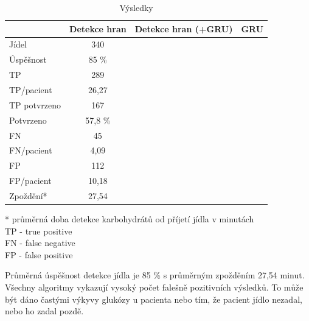 \begin{table}[H]
\caption{Výsledky}
\label{tab:results}
\begin{tabular}{|l|c|c|c|}
\hline 
& \textbf{Detekce hran} & \textbf{Detekce hran (+GRU)} & \textbf{ GRU }\\
\hline 
\hline 
Jídel & 340 &  &  \\\hline
Úspěšnost & 85 \% &  &  \\\hline
TP & 289 &  &  \\\hline
TP/pacient & 26,27 &  &  \\\hline
TP potvrzeno & 167 &  &  \\\hline
Potvrzeno & 57,8 \% &  &  \\\hline
FN & 45 &  &  \\\hline
FN/pacient & 4,09 &  &  \\\hline
FP & 112 &  &  \\\hline
FP/pacient & 10,18 &  &  \\\hline
Zpoždění* & 27,54 &  &  \\
\hline
\end{tabular}
\begin{flushleft}
* průměrná doba detekce karbohydrátů od příjetí jídla v minutách\\
TP - true positive\\
FN - false negative\\
FP - false positive\\
\end{flushleft}
\end{table}

Průměrná úspěšnost detekce jídla je 85 \% s průměrným zpožděním 27,54 minut. Všechny algoritmy vykazují vysoký počet falešně pozitivních výsledků. To může být dáno častými výkyvy glukózy u pacienta nebo tím, že pacient jídlo nezadal, nebo ho zadal pozdě.